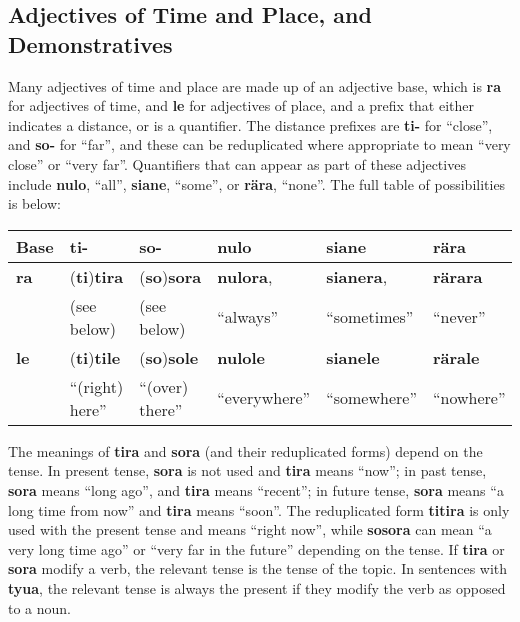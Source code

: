 \documentclass{article}
\begin{document}
\subsection{Adjectives of Time and Place, and Demonstratives}

Many adjectives of time and place are made up of an adjective base, which is \textbf{ra} for adjectives of time, and \textbf{le} for adjectives of place, and a prefix that either indicates a distance, or is a quantifier.  The distance prefixes are \textbf{ti-} for ``close'', and \textbf{so-} for ``far'', and these can be reduplicated where appropriate to mean ``very close'' or ``very far''.  Quantifiers that can appear as part of these adjectives include \textbf{nulo}, ``all'', \textbf{siane}, ``some'', or \textbf{r\"ara}, ``none''.  The full table of possibilities is below:

\begin{table}[htb!]
\begin{tabular}{|l|l l l l l|}
\hline
Base & \textbf{ti-} & \textbf{so-} & \textbf{nulo} & \textbf{siane} & \textbf{r\"ara} \\
\hline
\textbf{ra} & (\textbf{ti})\textbf{tira} & (\textbf{so})\textbf{sora} & \textbf{nulora}, & \textbf{sianera}, & \textbf{r\"arara} \\
& (see below) & (see below) & ``always'' & ``sometimes'' & ``never'' \\
\hline
\textbf{le} & (\textbf{ti})\textbf{tile}& (\textbf{so})\textbf{sole} & \textbf{nulole} & \textbf{sianele} & \textbf{r\"arale} \\
& ``(right) here'' & ``(over) there'' & ``everywhere'' & ``somewhere'' & ``nowhere'' \\
\hline
\end{tabular}
\end{table}

The meanings of \textbf{tira} and \textbf{sora} (and their reduplicated forms) depend on the tense.  In present tense, \textbf{sora} is not used and \textbf{tira} means ``now''; in past tense, \textbf{sora} means ``long ago'', and \textbf{tira} means ``recent''; in future tense, \textbf{sora} means ``a long time from now'' and \textbf{tira} means ``soon''.  The reduplicated form \textbf{titira} is only used with the present tense and means ``right now'', while \textbf{sosora} can mean ``a very long time ago'' or ``very far in the future'' depending on the tense.  If \textbf{tira} or \textbf{sora} modify a verb, the relevant tense is the tense of the topic.  In sentences with \textbf{tyua}, the relevant tense is always the present if they modify the verb as opposed to a noun.
\end{document}
